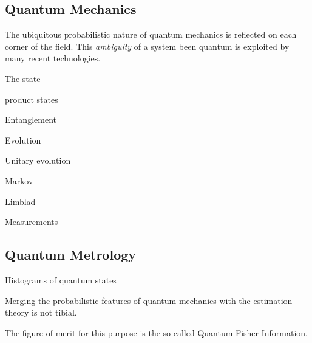 \subsection{Quantum Mechanics}
The ubiquitous probabilistic nature of quantum mechanics is reflected on each corner of the field.
This \emph{ambiguity} of a system been quantum is exploited by many recent technologies.

The state

product states

Entanglement

Evolution

Unitary evolution

Markov

Limblad

Measurements

\subsection{Quantum Metrology}

Histograms of quantum states

Merging the probabilistic features of quantum mechanics with the estimation theory is not tibial.

The figure of merit for this purpose is the so-called Quantum Fisher Information.
